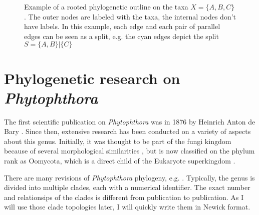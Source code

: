 \begin{figure}
  \centering
  \caption{Example of a rooted phylogenetic outline on the taxa $X = \{A, B,
  C\}$. The outer nodes are labeled with the taxa, the internal nodes don't have
  labels. In this example, each edge and each pair of parallel edges can be seen
  as a split, e.g. the cyan edges depict the split $S = \{A, B\} | \{C\}$}
  \label{fig:outlineExample}
\end{figure}

\section{Phylogenetic research on \textit{Phytophthora}} 

The first scientific publication on \textit{Phytophthora} was in 1876 by
Heinrich Anton de Bary \cite{kroonGenusPhytophthoraAnno2012}. Since then, extensive research has been conducted on
a variety of aspects about this genus. Initially, it was thought to be part of
the fungi kingdom because of several morphological similarities
, but is now classified on the phylum rank as Oomycota, which is
a direct child of the Eukaryote superkingdom .


There are many revisions of \textit{Phytophthora} phylogeny, e.g.
\cite{kroonGenusPhytophthoraAnno2012,yangExpandedPhylogenyGenus2017,abadPhytophthoraTaxonomicPhylogenetic2023a}.
Typically, the genus is divided into multiple clades, each with a numerical
identifier. The exact number and relationsips of the clades is different from
publication to publication. As I will use those clade topologies later, I will
quickly write them in Newick format.

